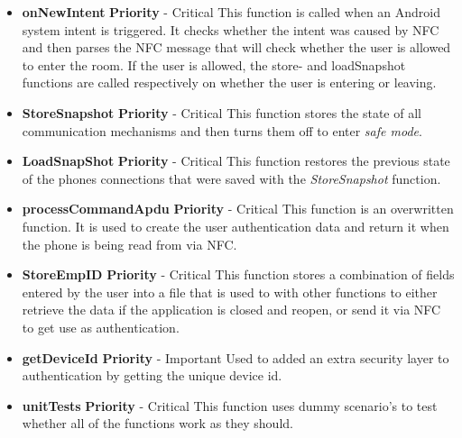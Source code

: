 \documentclass{article}
\begin{document}
		\begin{itemize}
			\item \textbf{onNewIntent}
				\newline\textbf{ Priority } - Critical
				\newline This function is called when an Android system intent is triggered. It checks whether the intent was caused by NFC and then parses the NFC message that will check whether the user is allowed to enter the room. If the user is allowed, the store- and loadSnapshot functions are called respectively on whether the user is entering or leaving.
			\item \textbf{StoreSnapshot}
				\newline\textbf{ Priority } - Critical
				\newline This function stores the state of all communication mechanisms and then turns them off to enter \textit{safe mode}.
			\item \textbf{LoadSnapShot}
				\newline\textbf{ Priority } - Critical
				\newline This function restores the previous state of the phones connections that were saved with the \textit{StoreSnapshot} function.
				\item \textbf{processCommandApdu}
				\newline\textbf{ Priority } - Critical
				\newline This function is an overwritten function. It is used to create the user authentication data and return it when the phone is being read from via NFC.
			\item \textbf{StoreEmpID}
				\newline\textbf{ Priority } - Critical
				\newline This function stores a combination of fields entered by the user into a file that is used to with other functions to either retrieve the data if the application is closed and reopen, or send it via NFC to get use as authentication.
			\item \textbf{getDeviceId}
				\newline\textbf{ Priority } - Important
				\newline Used to added an extra security layer to authentication by getting the unique device id.
			\item \textbf{unitTests}
				\newline\textbf{ Priority } - Critical
				\newline This function uses dummy scenario's to test whether all of the functions work as they should.


\end{itemize}
\end{document}
